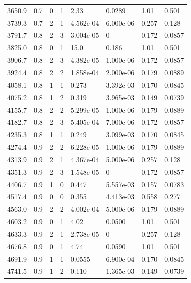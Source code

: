 \documentclass[preview]{standalone}
\begin{document}
{{{\begin{tabular}{L{1.2cm}C{1.2cm} C{0.3cm}C{0.5cm} C{1.4cm}C{1.4cm} C{1.4cm}C{1.4cm}}
  3650.9  &   0.7  & 0     &  1 &  2.33  & 0.0289  & 1.01 &  0.501   \\ 
  3739.3  &   0.7  & 2     &  1 &  4.562e-04  & 6.000e-06  & 0.257 &  0.128   \\ 
  3791.7  &   0.8  & 2     &  3 &  3.004e-05  & 0  & 0.172 &  0.0857   \\ 
  3825.0  &   0.8  & 0     &  1 &  15.0  & 0.186  & 1.01 &  0.501   \\ 
  3906.7  &   0.8  & 2     &  3 &  4.382e-05  & 1.000e-06  & 0.172 &  0.0857   \\ 
  3924.4  &   0.8  & 2     &  2 &  1.858e-04  & 2.000e-06  & 0.179 &  0.0889   \\ 
  4058.1  &   0.8  & 1     &  1 &  0.273  & 3.392e-03  & 0.170 &  0.0845   \\ 
  4075.2  &   0.8  & 1     &  2 &  0.319  & 3.965e-03  & 0.149 &  0.0739   \\ 
  4155.7  &   0.8  & 2     &  2 &  5.299e-05  & 1.000e-06  & 0.179 &  0.0889   \\ 
  4182.7  &   0.8  & 2     &  3 &  5.405e-04  & 7.000e-06  & 0.172 &  0.0857   \\ 
  4235.3  &   0.8  & 1     &  1 &  0.249  & 3.099e-03  & 0.170 &  0.0845   \\ 
  4274.4  &   0.9  & 2     &  2 &  6.228e-05  & 1.000e-06  & 0.179 &  0.0889   \\ 
  4313.9  &   0.9  & 2     &  1 &  4.367e-04  & 5.000e-06  & 0.257 &  0.128   \\ 
  4351.3  &   0.9  & 2     &  3 &  1.548e-05  & 0  & 0.172 &  0.0857   \\ 
  4406.7  &   0.9  & 1     &  0 &  0.447  & 5.557e-03  & 0.157 &  0.0783   \\ 
  4517.4  &   0.9  & 0     &  0 &  0.355  & 4.413e-03  & 0.558 &  0.277   \\ 
  4563.0  &   0.9  & 2     &  2 &  4.002e-04  & 5.000e-06  & 0.179 &  0.0889   \\ 
  4603.2  &   0.9  & 0     &  1 &  4.02  & 0.0500  & 1.01 &  0.501   \\ 
  4633.3  &   0.9  & 2     &  1 &  2.738e-05  & 0  & 0.257 &  0.128   \\ 
  4676.8  &   0.9  & 0     &  1 &  4.74  & 0.0590  & 1.01 &  0.501   \\ 
  4691.9  &   0.9  & 1     &  1 &  0.0555  & 6.900e-04  & 0.170 &  0.0845   \\ 
  4741.5  &   0.9  & 1     &  2 &  0.110  & 1.365e-03  & 0.149 &  0.0739   \\ 

\end{tabular}}}}
\end{document}
